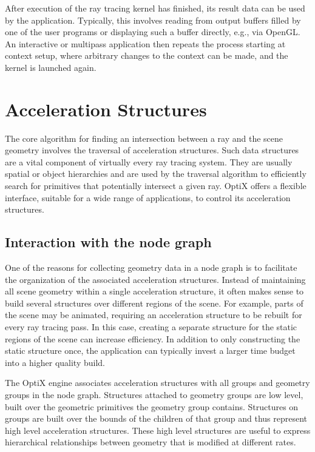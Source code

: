 After execution of the ray tracing kernel has finished, its result data
can be used by the application. Typically, this involves reading
from output buffers filled by one of the user programs or displaying
such a buffer directly, e.g., via OpenGL. An interactive or multipass application then repeats the process starting at context setup,
where arbitrary changes to the context can be made, and the kernel
is launched again.

\section{Acceleration Structures}

The core algorithm for finding an intersection between a ray and
the scene geometry involves the traversal of acceleration structures.
Such data structures are a vital component of virtually every ray
tracing system. They are usually spatial or object hierarchies and
are used by the traversal algorithm to efficiently search for primitives that potentially intersect a given ray. OptiX offers a flexible
interface, suitable for a wide range of applications, to control its
acceleration structures.

\subsection{Interaction with the node graph}

One of the reasons for collecting geometry data in a node graph is to
facilitate the organization of the associated acceleration structures.
Instead of maintaining all scene geometry within a single acceleration structure, it often makes sense to build several structures over
different regions of the scene. For example, parts of the scene may
be animated, requiring an acceleration structure to be rebuilt for every ray tracing pass. In this case, creating a separate structure for
the static regions of the scene can increase efficiency. In addition
to only constructing the static structure once, the application can
typically invest a larger time budget into a higher quality build.

The OptiX engine associates acceleration structures with all groups
and geometry groups in the node graph. Structures attached to geometry groups are low level, built over the geometric primitives the
geometry group contains. Structures on groups are built over the
bounds of the children of that group and thus represent high level
acceleration structures. These high level structures are useful to express hierarchical relationships between geometry that is modified
at different rates.

